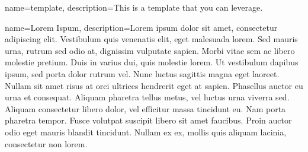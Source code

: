 \usepackage{glossaries}
 
{
	name={template},
	description={This is a template that you can leverage.}
}

{
	name={Lorem Ispum},
	description={Lorem ipsum dolor sit amet, consectetur adipiscing elit. Vestibulum quis venenatis elit, eget malesuada lorem. Sed mauris urna, rutrum sed odio at, dignissim vulputate sapien. Morbi vitae sem ac libero molestie pretium. Duis in varius dui, quis molestie lorem. Ut vestibulum dapibus ipsum, sed porta dolor rutrum vel. Nunc luctus sagittis magna eget laoreet. Nullam sit amet risus at orci ultrices hendrerit eget at sapien. Phasellus auctor eu urna et consequat. Aliquam pharetra tellus metus, vel luctus urna viverra sed. Aliquam consectetur libero dolor, vel efficitur massa tincidunt eu. Nam porta pharetra tempor. Fusce volutpat suscipit libero sit amet faucibus. Proin auctor odio eget mauris blandit tincidunt. Nullam ex ex, mollis quis aliquam lacinia, consectetur non lorem. 
}}






\makeglossaries
